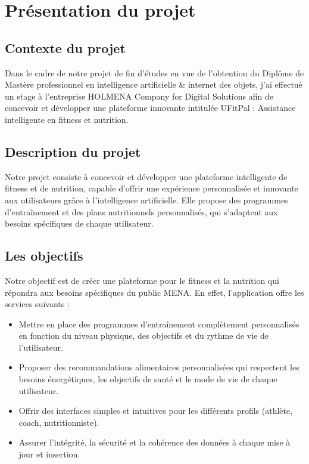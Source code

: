 ﻿\documentclass[a4paper,12pt]{report}
\begin{document}
\section{Présentation du projet}

\subsection{Contexte du projet}
Dans le cadre de notre projet de fin d'études en vue de l'obtention du Diplôme de Mastère professionnel en intelligence artificielle \& internet des objets, j’ai effectué un stage à l’entreprise HOLMENA Company for Digital Solutions afin de concevoir et développer une plateforme innovante intitulée UFitPal : Assistance intelligente en fitness et nutrition.

\subsection{Description du projet}
Notre projet consiste à concevoir et développer une plateforme intelligente de fitness et de nutrition, capable d'offrir une expérience personnalisée et innovante aux utilisateurs grâce à l'intelligence artificielle. Elle propose des programmes d’entraînement et des plans nutritionnels personnalisés, qui s'adaptent aux besoins spécifiques de chaque utilisateur.

\subsection{Les objectifs}
Notre objectif est de créer une plateforme pour le fitness et la nutrition qui répondra aux besoins spécifiques du public MENA. En effet, l'application offre les services suivants :

\begin{itemize}[label=]
  \item Mettre en place des programmes d'entraînement complètement personnalisés en fonction du niveau physique, des objectifs et du rythme de vie de l'utilisateur.
   \item Proposer des recommandations alimentaires personnalisées qui respectent les besoins énergétiques, les objectifs de santé et le mode de vie de chaque utilisateur.
  \item Offrir des interfaces simples et intuitives pour les différents profils (athlète, coach, nutritionniste).
  \item Assurer l'intégrité, la sécurité et la cohérence des données à chaque mise à jour et insertion.
  \end{itemize}
\end{document}
